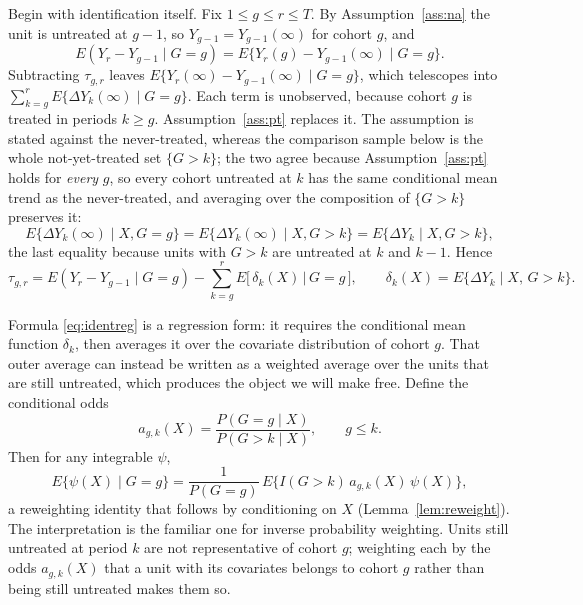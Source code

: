 \documentclass[12pt]{article}
\theoremstyle{remark}
\begin{document}
Begin with identification itself. Fix $1 \le g \le r \le T$. By Assumption~\ref{ass:na}
the unit is untreated at $g-1$, so $Y_{g-1} = Y_{g-1}(\infty)$ for cohort $g$, and
\[
E(Y_r - Y_{g-1} \mid G{=}g) = E\{Y_r(g) - Y_{g-1}(\infty) \mid G{=}g\}.
\]
Subtracting $\tau_{g,r}$ leaves $E\{Y_r(\infty) - Y_{g-1}(\infty) \mid G{=}g\}$, which
telescopes into $\sum_{k=g}^{r} E\{\Delta Y_k(\infty) \mid G{=}g\}$. Each term is
unobserved, because cohort $g$ is treated in periods $k \ge g$. Assumption~\ref{ass:pt}
replaces it. The assumption is stated against the never-treated, whereas the comparison
sample below is the whole not-yet-treated set $\{G > k\}$; the two agree because
Assumption~\ref{ass:pt} holds for \emph{every} $g$, so every cohort untreated at $k$ has
the same conditional mean trend as the never-treated, and averaging over the composition
of $\{G > k\}$ preserves it:
\[
E\{\Delta Y_k(\infty) \mid X, G = g\} = E\{\Delta Y_k(\infty) \mid X, G > k\}
= E\{\Delta Y_k \mid X, G > k\},
\]
the last equality because units with $G > k$ are untreated at $k$ and $k-1$. Hence
\begin{equation}
\tau_{g,r} = E(Y_r - Y_{g-1} \mid G{=}g)
 - \sum_{k=g}^{r} E\big[\,\delta_k(X) \,\big|\, G{=}g\,\big],
\qquad \delta_k(X) = E\{\Delta Y_k \mid X,\, G > k\}.
\label{eq:identreg}
\end{equation}

Formula \eqref{eq:identreg} is a regression form: it requires the conditional mean
function $\delta_k$, then averages it over the covariate distribution of cohort $g$. That
outer average can instead be written as a weighted average over the units that are still
untreated, which produces the object we will make free. Define the conditional odds
\begin{equation}
a_{g,k}(X) = \frac{P(G = g \mid X)}{P(G > k \mid X)}, \qquad g \le k.
\label{eq:odds}
\end{equation}
Then for any integrable $\psi$,
\begin{equation}
E\{\psi(X) \mid G = g\}
 = \frac{1}{P(G{=}g)}\, E\big\{ I(G > k)\, a_{g,k}(X)\, \psi(X) \big\},
\label{eq:reweight}
\end{equation}
a reweighting identity that follows by conditioning on $X$
(Lemma~\ref{lem:reweight}). The interpretation is the familiar one for inverse
probability weighting. Units still
untreated at period $k$ are not representative of cohort $g$; weighting each by the odds
$a_{g,k}(X)$ that a unit with its covariates belongs to cohort $g$ rather than being still
untreated makes them so.
\end{document}
